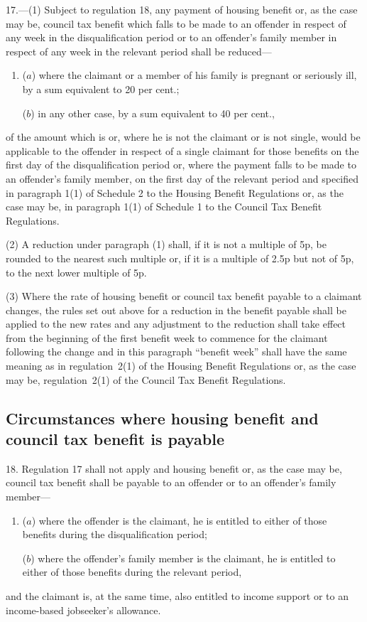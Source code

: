 \documentclass[12pt,a4paper]{article}
\begin{document}
17.---(1)  Subject to regulation 18, any payment of housing benefit or, as the case may be, council tax benefit which falls to be made to an offender in respect of any week in the disqualification period or to an offender’s family member in respect of any week in the relevant period shall be reduced—
\begin{enumerate}\item[]
($a$) where the claimant or a member of his family is pregnant or seriously ill, by a sum equivalent to 20 per cent.;

($b$) in any other case, by a sum equivalent to 40 per cent.,
\end{enumerate}
of the amount which is or, where he is not the claimant or is not single, would be applicable to the offender in respect of a single claimant for those benefits on the first day of the disqualification period or, where the payment falls to be made to an offender’s family member, on the first day of the relevant period and specified in paragraph 1(1) of Schedule 2 to the Housing Benefit Regulations or, as the case may be, in paragraph 1(1) of Schedule 1 to the Council Tax Benefit Regulations.

(2) A reduction under paragraph (1) shall, if it is not a multiple of 5p, be rounded to the nearest such multiple or, if it is a multiple of 2$.$5p but not of 5p, to the next lower multiple of 5p.

(3) Where the rate of housing benefit or council tax benefit payable to a claimant changes, the rules set out above for a reduction in the benefit payable shall be applied to the new rates and any adjustment to the reduction shall take effect from the beginning of the first benefit week to commence for the claimant following the change and in this paragraph “benefit week” shall have the same meaning as in regulation~2(1) of the Housing Benefit Regulations or, as the case may be, regulation~2(1) of the Council Tax Benefit Regulations.

\subsection[18. Circumstances where housing benefit and council tax benefit is payable]{Circumstances where housing benefit and council tax benefit is payable}

18.  Regulation 17 shall not apply and housing benefit or, as the case may be, council tax benefit shall be payable to an offender or to an offender’s family member—
\begin{enumerate}\item[]
($a$) where the offender is the claimant, he is entitled to either of those benefits during the disqualification period;

($b$) where the offender’s family member is the claimant, he is entitled to either of those benefits during the relevant period,
\end{enumerate}
and the claimant is, at the same time, also entitled to income support or to an income-based jobseeker’s allowance.
\end{document}
